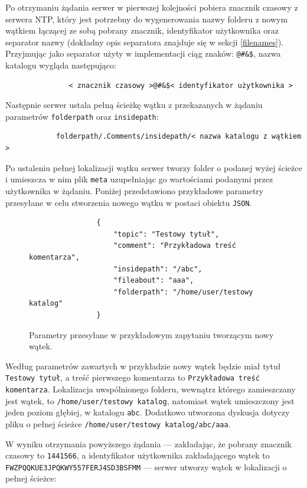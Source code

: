 Po otrzymaniu żądania serwer w pierwszej kolejności pobiera znacznik czasowy z serwera NTP, który jest potrzebny do wygenerowania nazwy folderu z nowym wątkiem łączącej ze sobą pobrany znacznik, identyfikator użytkownika oraz separator nazwy (dokładny opis separatora znajduje się w sekcji \ref{filenames}). Przyjmując jako separator użyty w implementacji ciąg znaków: \texttt{@\#\&\$}, nazwa katalogu wygląda następująco:

\begin{verbatim}
               < znacznik czasowy >@#&$< identyfikator użytkownika >
\end{verbatim}

Następnie serwer ustala pełną ścieżkę wątku z przekazanych w żądaniu parametrów \texttt{folderpath} oraz \texttt{insidepath}:

\begin{verbatim}
            folderpath/.Comments/insidepath/< nazwa katalogu z wątkiem >
\end{verbatim}

Po ustaleniu pełnej lokalizacji wątku serwer tworzy folder o podanej wyżej ścieżce i umieszcza w nim plik \texttt{meta} uzupełniając go wartościami podanymi przez użytkownika w żądaniu. Poniżej przedstawiono przykładowe parametry przesyłane w celu stworzenia nowego wątku w postaci obiektu \texttt{JSON}.

\begin{figure}[htb]
\begin{verbatim}
                {
                    "topic": "Testowy tytuł", 
                    "comment": "Przykładowa treść komentarza", 
                    "insidepath": "/abc", 
                    "fileabout": "aaa", 
                    "folderpath": "/home/user/testowy katalog"
                }
\end{verbatim}
  \caption{Parametry przesyłane w przykładowym zapytaniu tworzącym nowy wątek.}
\end{figure}

Według parametrów zawartych w przykładzie nowy wątek będzie miał tytuł \texttt{Testowy tytuł}, a treść pierwszego komentarza to \texttt{Przykładowa treść komentarza}. Lokalizacja uwspólnionego folderu, wewnątrz którego zamieszczany jest wątek, to \texttt{/home/user/\-testowy katalog}, natomiast wątek umieszczony jest jeden poziom głębiej, w katalogu \texttt{abc}. Dodatkowo utworzona dyskusja dotyczy pliku o pełnej ścieżce \texttt{/home/user/\-testowy katalog/\-abc/aaa}.

W wyniku otrzymania powyższego żądania --- zakładając, że pobrany znacznik czasowy to \texttt{1441566}, a identyfikator użytkownika zakładającego wątek to \texttt{FWZPQQKU\-E3JPQKWY5\-57FERJ4S\-D3BSFMM} --- serwer utworzy wątek w lokalizacji o pełnej ścieżce:

